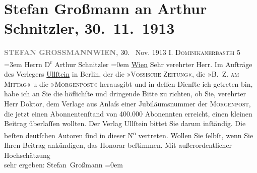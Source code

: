 

         
         \renewcommand{\erwaehntePersonen}{Personen: Stefan Großmann}
         \renewcommand{\erwaehnteInstitutionen}{Institutionen: B.Z. am Mittag, Morgenpost, Ullstein Verlag, Vossische Zeitung}
         \renewcommand{\erwaehnteOrte}{Orte: Berlin, Dominikanerbastei, Wien}
         \renewcommand{\erwaehnteWerke}{}
               \section[Stefan Großmann an Arthur Schnitzler, 30. 11. 1913]{ Stefan Großmann an Arthur Schnitzler, 30. 11. 1913}\nopagebreak{}\rehead{ }\begin{ledgroupsized}[t]{13cm}\normalsize\beginnumbering{} \toendnotes[C]{\smallbreak\pagebreak[2]} 
\pstart
           \noindent{}{\pb}\textcolor{gray}{\textbf{STEFAN GROSSMANN}}\hfill \textcolor{gray}{\textbf{WIEN,}}{ }30.  Nov. 1913\pend
           \pstart
           \raggedleft{}I. \textsc{Dominikanerbastei}
                     5\pend
           \leftskip=3em{}\pstart
           \noindent{}Herrn D\textsuperscript{r} Arthur Schnitzler\pend
           \leftskip=0em{}\pstart
           \noindent{}\raggedleft{}\uline{Wien}\pend
           \pstart{}Sehr verehrter Herr.\pend\pstart
           Im Aufträge des Verlegers \uline{Ullſtein} in Berlin, der die »\textsc{Vossische Zeitung}«, die »\textsc{B. Z. am Mittag}« u die »\textsc{Morgenpost}« herausgibt und in deſſen Dienſte ich getreten bin, habe ich an Sie die
               höflichſte und dringende Bitte zu richten, ob Sie, verehrter Herr Doktor, dem Verlage
               aus Anlaſs einer Jubiläumsnummer der \textsc{Morgenpost}, die jetzt einen Abonnentenſtand von 400.000 Abonennten erreicht, einen kleinen
               Beitrag überlaſſen wollten.\pend
           \pstart
           Der Verlag Ullſtein bittet Sie darum inſtändig.
               Die beſten deutſchen Autoren ſind in dieser N\textsuperscript{o} vertreten.
               Wollen Sie ſelbſt, wenn Sie Ihren Beitrag ankündigen, das Honorar beſtimmen.\pend
           \pstart
           Mit außerordentlicher Hochschätzung{\\[\baselineskip]}sehr ergeben: \spacefill\mbox{Stefan
                  Großmann}\pend
           \leftskip=0em{}
         

\end{ledgroupsized}
